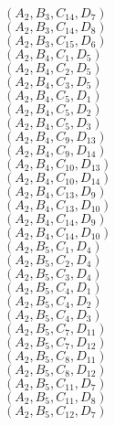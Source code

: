 \documentclass[14pt]{article}
\begin{document}
    $({A}_{2}, {B}_{3}, {C}_{14}, {D}_{7}) $ \\ 
    $({A}_{2}, {B}_{3}, {C}_{14}, {D}_{8}) $ \\ 
    $({A}_{2}, {B}_{3}, {C}_{15}, {D}_{6}) $ \\ 
    $({A}_{2}, {B}_{4}, {C}_{1}, {D}_{5}) $ \\ 
    $({A}_{2}, {B}_{4}, {C}_{2}, {D}_{5}) $ \\ 
    $({A}_{2}, {B}_{4}, {C}_{3}, {D}_{5}) $ \\ 
    $({A}_{2}, {B}_{4}, {C}_{5}, {D}_{1}) $ \\ 
    $({A}_{2}, {B}_{4}, {C}_{5}, {D}_{2}) $ \\ 
    $({A}_{2}, {B}_{4}, {C}_{5}, {D}_{3}) $ \\ 
    $({A}_{2}, {B}_{4}, {C}_{9}, {D}_{13}) $ \\ 
    $({A}_{2}, {B}_{4}, {C}_{9}, {D}_{14}) $ \\ 
    $({A}_{2}, {B}_{4}, {C}_{10}, {D}_{13}) $ \\ 
    $({A}_{2}, {B}_{4}, {C}_{10}, {D}_{14}) $ \\ 
    $({A}_{2}, {B}_{4}, {C}_{13}, {D}_{9}) $ \\ 
    $({A}_{2}, {B}_{4}, {C}_{13}, {D}_{10}) $ \\ 
    $({A}_{2}, {B}_{4}, {C}_{14}, {D}_{9}) $ \\ 
    $({A}_{2}, {B}_{4}, {C}_{14}, {D}_{10}) $ \\ 
    $({A}_{2}, {B}_{5}, {C}_{1}, {D}_{4}) $ \\ 
    $({A}_{2}, {B}_{5}, {C}_{2}, {D}_{4}) $ \\ 
    $({A}_{2}, {B}_{5}, {C}_{3}, {D}_{4}) $ \\ 
    $({A}_{2}, {B}_{5}, {C}_{4}, {D}_{1}) $ \\ 
    $({A}_{2}, {B}_{5}, {C}_{4}, {D}_{2}) $ \\ 
    $({A}_{2}, {B}_{5}, {C}_{4}, {D}_{3}) $ \\ 
    $({A}_{2}, {B}_{5}, {C}_{7}, {D}_{11}) $ \\ 
    $({A}_{2}, {B}_{5}, {C}_{7}, {D}_{12}) $ \\ 
    $({A}_{2}, {B}_{5}, {C}_{8}, {D}_{11}) $ \\ 
    $({A}_{2}, {B}_{5}, {C}_{8}, {D}_{12}) $ \\ 
    $({A}_{2}, {B}_{5}, {C}_{11}, {D}_{7}) $ \\ 
    $({A}_{2}, {B}_{5}, {C}_{11}, {D}_{8}) $ \\ 
    $({A}_{2}, {B}_{5}, {C}_{12}, {D}_{7}) $ \\ 
\end{document}
